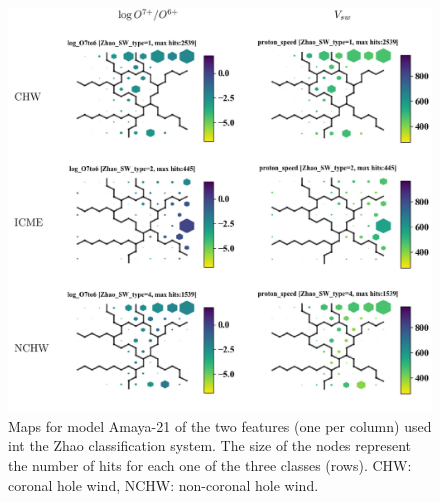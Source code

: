 \documentclass[utf8]{frontiersSCNS} %
\begin{document}
\begin{figure}[h!]\centering
	\includegraphics[width=14cm]{SWtypeZ}
	\caption{Maps for model Amaya-21 of the two features (one per column) used int the Zhao classification system. The size of the nodes represent the number of hits for each one of the three classes (rows). CHW: coronal hole wind, NCHW: non-coronal hole wind.}\label{fig:SWtypeZ}
\end{figure}
\end{document}
